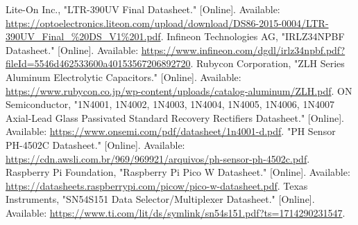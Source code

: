 \documentclass[12pt]{article} %
\begin{document}
\begin{thebibliography}{99}
     Lite-On Inc., "LTR-390UV Final Datasheet." [Online]. Available: \url{https://optoelectronics.liteon.com/upload/download/DS86-2015-0004/LTR-390UV_Final_%20DS_V1%201.pdf}.
     Infineon Technologies AG, "IRLZ34NPBF Datasheet." [Online]. Available: \url{https://www.infineon.com/dgdl/irlz34npbf.pdf?fileId=5546d462533600a40153567206892720}.
     Rubycon Corporation, "ZLH Series Aluminum Electrolytic Capacitors." [Online]. Available: \url{https://www.rubycon.co.jp/wp-content/uploads/catalog-aluminum/ZLH.pdf}.
     ON Semiconductor, "1N4001, 1N4002, 1N4003, 1N4004, 1N4005, 1N4006, 1N4007 Axial-Lead Glass Passivated Standard Recovery Rectifiers Datasheet." [Online]. Available: \url{https://www.onsemi.com/pdf/datasheet/1n4001-d.pdf}.
     "PH Sensor PH-4502C Datasheet." [Online]. Available: \url{https://cdn.awsli.com.br/969/969921/arquivos/ph-sensor-ph-4502c.pdf}.
     Raspberry Pi Foundation, "Raspberry Pi Pico W Datasheet." [Online]. Available: \url{https://datasheets.raspberrypi.com/picow/pico-w-datasheet.pdf}.
     Texas Instruments, "SN54S151 Data Selector/Multiplexer Datasheet." [Online]. Available: \url{https://www.ti.com/lit/ds/symlink/sn54s151.pdf?ts=1714290231547}.

\end{thebibliography}
\end{document}

